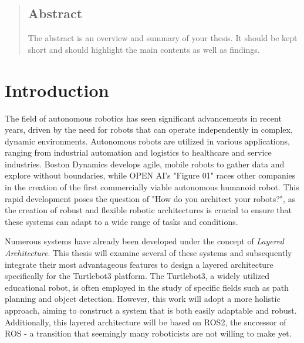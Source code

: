 \documentclass[%
paper=A4,               %
twoside=true,           %
openright,              %
11pt,                   %
bibliography=totoc,     %
titlepage=on,           %
DIV=12,                 %
BCOR=1.5cm,             %
parskip=half,            %
final
]{scrreprt}
\begin{document}
	\onehalfspacing
	\begin{titlepage}
		
	\end{titlepage}
	


	\tableofcontents
	\cleardoublepage

	\begin{abstract}
		\section{Abstract}
	
	The abstract is an overview and summary of your thesis. It should be kept short and should highlight the main contents as well as findings. 
	
	\end{abstract}
	
	
	\chapter{Introduction}
	The field of autonomous robotics has seen significant advancements in recent years, driven by the need for robots that can operate independently in complex, dynamic environments. Autonomous robots are utilized in various applications, ranging from industrial automation and logistics to healthcare and service industries. Boston Dynamics develops agile, mobile robots to gather data and explore without boundaries, while OPEN AI's "Figure 01" races other companies in the creation of the first commercially viable autonomous humanoid robot. This rapid development poses the question of "How do you architect your robots?",
	as the creation of robust and flexible robotic architectures is crucial to ensure that these systems can adapt to a wide range of tasks and conditions. \newline
	
	Numerous systems have already been developed under the concept of \textit{Layered Architecture}. This thesis will examine several of these systems and subsequently integrate their most advantageous features to design a layered architecture specifically for the Turtlebot3 platform. The Turtlebot3, a widely utilized educational robot, is often employed in the study of specific fields such as path planning and object detection. However, this work will adopt a more holistic approach, aiming to construct a system that is both easily adaptable and robust. Additionally, this layered architecture will be based on ROS2, the successor of ROS - a transition that seemingly many roboticists are not willing to make yet. %
	
\end{document}
